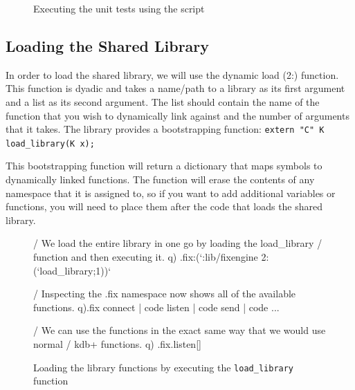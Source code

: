 \begin{figure}[H]
\caption{Executing the unit tests using the script}
\end{figure}

\subsection{Loading the Shared Library}
In order to load the shared library, we will use the dynamic load (2:) function. This function is dyadic
and takes a name/path to a library as its first argument and a list as its second argument. The list should
contain the name of the function that you wish to dynamically link against and the number of arguments that
it takes. The library provides a bootstrapping function: \texttt{extern "C" K load_library(K x);}

This bootstrapping function will return a dictionary that maps symbols to dynamically linked functions. The
function will erase the contents of any namespace that it is assigned to, so if you want to add additional
variables or functions, you will need to place them after the code that loads the shared library.

\begin{figure}[H]
\begin{qcode}
/ We load the entire library in one go by loading the load_library
/ function and then executing it.
q) .fix:(`:lib/fixengine 2:(`load_library;1))`

/ Inspecting the .fix namespace now shows all of the available functions.
q).fix
connect              | code
listen               | code
send                 | code
...

/ We can use the functions in the exact same way that we would use normal
/ kdb+ functions.
q) .fix.listen[]
\end{qcode}
\caption{Loading the library functions by executing the \texttt{load_library} function}
\end{figure}

